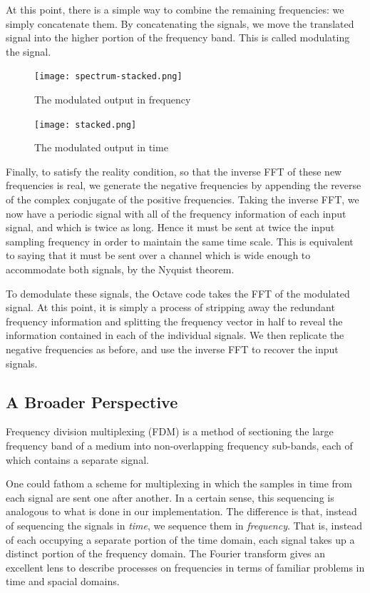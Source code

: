 \documentclass[12pt]{article}
\begin{document}
At this point, there is
a simple way to combine the remaining frequencies: we simply concatenate them.
By concatenating the signals, we move the translated signal into the higher 
portion of the frequency band. This is called modulating the signal.

\begin{figure}[H]
\hspace*{-.35 in}
\begin{minipage}[t]{0.5\linewidth}
\centering
\texttt{[image: spectrum-stacked.png]}
\caption{The modulated output in frequency}
\label{fig:figure4}
\end{minipage}
\hspace{0.5cm}
\begin{minipage}[t]{0.5\linewidth}
\centering
\texttt{[image: stacked.png]}
\caption{The modulated output in time}
\label{fig:figure4}
\end{minipage}
\end{figure}

Finally, to satisfy the reality condition, so that the inverse FFT of these
new frequencies is real, we generate the negative frequencies by appending
the reverse of the complex conjugate of the positive frequencies. Taking the
inverse FFT, we now have a periodic signal with all of the frequency
information of each input signal, and which is twice as long. Hence it must
be sent at twice the input sampling frequency in order to maintain the same
time scale. This is equivalent to saying that it must be sent over a channel
which is wide enough to accommodate both signals, by the Nyquist theorem.

To demodulate these signals, the Octave code takes the FFT of the modulated
signal. At this point, it is simply a process of stripping away the redundant
frequency information and splitting the frequency vector in half to reveal
the information contained in each of the individual signals. We then
replicate the negative frequencies as before, and use the inverse FFT to
recover the input signals.

\subsection{A Broader Perspective}
Frequency division multiplexing (FDM) is a method of sectioning the large
frequency band of a medium into non-overlapping frequency sub-bands, each of
which contains a separate signal.

One could fathom a scheme for multiplexing in which the samples in time from
each signal are sent one after another. In a certain sense, this sequencing
is analogous to what is done in our implementation. The difference is that,
instead of sequencing the signals in \emph{time}, we sequence them in
\emph{frequency}. That is, instead of each occupying a separate portion of the
time domain, each signal takes up a distinct portion of the frequency domain.
The Fourier transform gives an excellent lens to describe processes on
frequencies in terms of familiar problems in time and spacial domains.
\end{document}
